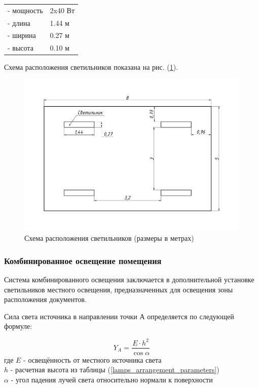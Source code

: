 \begin{tabular}{ll}
    - мощность    & 2x40 Вт   \\
    - длина       & 1.44 м    \\
    - ширина      & 0.27 м    \\
    - высота      & 0.10 м    \\
\end{tabular}

Схема расположения светильников показана на рис. (\ref{pic_lamps_arrangement}).

\begin{figure}[ht]
    \centering
    \includegraphics[width=\textwidth, keepaspectratio, clip=true, trim=0mm 25mm 0mm 20mm]
                    {./src/ecology/pictures/lights_arrangement}
    \caption{Схема расположения светильников (размеры в метрах)}
    \label{pic_lamps_arrangement}
\end{figure}


\subsubsection{Комбинированное освещение помещения}

Система комбинированного освещения заключается в дополнительной установке
светильников местного освещения, предназначенных для освещения зоны расположения
документов.

Сила света источника в направлении точки А определяется по следующей формуле:

\begin{equation}
    Y_A = \frac{E \cdot h^2}{\cos \alpha}
    \label{light_source_power_in_dot_direction}
\end{equation}
где $E$ - освещённость от местного источника света                      \\
$h$ - расчетная высота из таблицы (\ref{lamps_arrangement_parameters})  \\
$\alpha$ -  угол падения лучей света относительно нормали к поверхности

